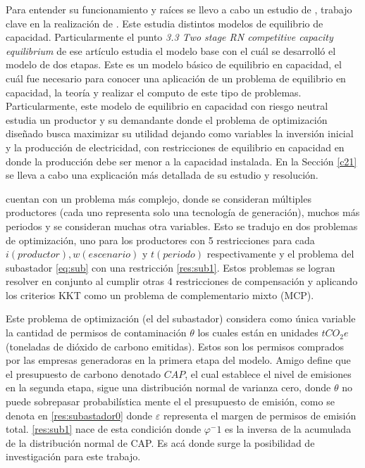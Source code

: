Para entender su funcionamiento y raíces se llevo a cabo un estudio de , trabajo clave en la realización de . Este estudia distintos modelos de equilibrio de capacidad. Particularmente el punto \textit{3.3 Two stage RN competitive capacity equilibrium} de ese artículo estudia el modelo base con el cuál se desarrolló el modelo de dos etapas. Este es un modelo básico de equilibrio en capacidad, el cuál fue necesario para conocer una aplicación de un problema de equilibrio en capacidad, la teoría y realizar el computo de este tipo de problemas. Particularmente, este modelo de equilibrio en capacidad con riesgo neutral estudia un productor y su demandante donde el problema de optimización diseñado busca maximizar su utilidad dejando como variables la inversión inicial y la producción de electricidad, con restricciones de equilibrio en capacidad en donde la producción debe ser menor a la capacidad instalada. En la Sección \ref{c21} se lleva a cabo una explicación más detallada de su estudio y resolución. 
\vspace{2.5mm}

 cuentan con un problema más complejo, donde se consideran múltiples productores (cada uno representa solo una tecnología de generación), muchos más periodos y se consideran muchas otra variables. Esto se tradujo en dos problemas de optimización, uno para los productores con 5 restricciones para cada $i(productor), w(escenario)$ y $t(periodo)$ respectivamente y el problema del subastador \ref{eq:sub} con una restricción \ref{res:sub1}. Estos problemas se logran resolver en conjunto al cumplir otras 4 restricciones de compensación y aplicando los criterios KKT como un problema de complementario mixto (MCP). 
\vspace{2.5mm}

Este problema de optimización (el del subastador) considera como única variable la cantidad de permisos de contaminación $\theta$ los cuales están en unidades $tCO_2 e$ (toneladas de dióxido de carbono emitidas). Estos son los permisos comprados por las empresas generadoras en la primera etapa del modelo. Amigo define que el presupuesto de carbono denotado $CAP$, el cual establece el nivel de emisiones en la segunda etapa, sigue una distribución normal de varianza cero, donde $\theta$ no puede sobrepasar probabilística mente el el presupuesto de emisión, como se denota en \ref{res:subastador0} donde $\varepsilon$ representa el margen de permisos de emisión total. \ref{res:sub1} nace de esta condición donde $\varphi^-1$ es la inversa de la acumulada de la distribución normal de CAP. Es acá donde surge la posibilidad de investigación para este trabajo. 
\vspace{2.5mm}

